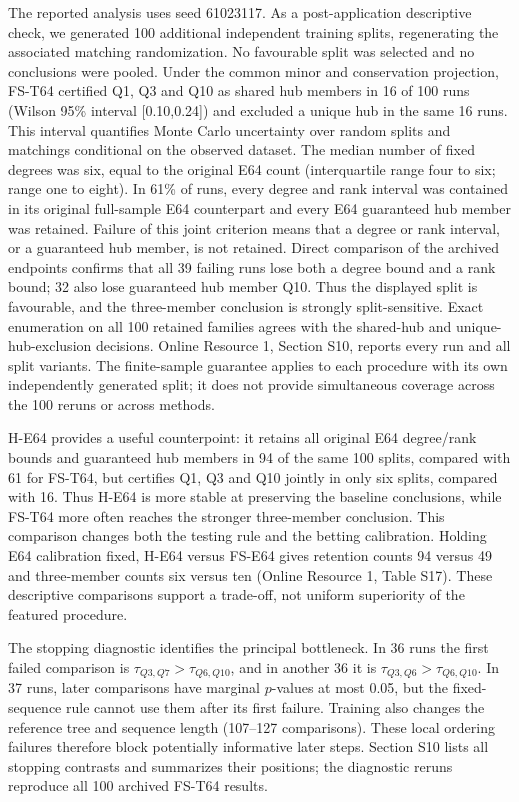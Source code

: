\documentclass[11pt]{article}
\theoremstyle{plain}
\theoremstyle{definition}\newtheorem{remark}{Remark}\newtheorem{example}{Example}
\begin{document}
The reported analysis uses seed 61023117. As a post-application descriptive check, we generated 100 additional independent training splits, regenerating the associated matching randomization. No favourable split was selected and no conclusions were pooled. Under the common minor and conservation projection, FS-T64 certified Q1, Q3 and Q10 as shared hub members in 16 of 100 runs (Wilson 95\% interval [0.10,0.24]) and excluded a unique hub in the same 16 runs. This interval quantifies Monte Carlo uncertainty over random splits and matchings conditional on the observed dataset. The median number of fixed degrees was six, equal to the original E64 count (interquartile range four to six; range one to eight). In 61\% of runs, every degree and rank interval was contained in its original full-sample E64 counterpart and every E64 guaranteed hub member was retained. Failure of this joint criterion means that a degree or rank interval, or a guaranteed hub member, is not retained. Direct comparison of the archived endpoints confirms that all 39 failing runs lose both a degree bound and a rank bound; 32 also lose guaranteed hub member Q10. Thus the displayed split is favourable, and the three-member conclusion is strongly split-sensitive. Exact enumeration on all 100 retained families agrees with the shared-hub and unique-hub-exclusion decisions. Online Resource 1, Section S10, reports every run and all split variants. The finite-sample guarantee applies to each procedure with its own independently generated split; it does not provide simultaneous coverage across the 100 reruns or across methods.

H-E64 provides a useful counterpoint: it retains all original E64 degree/rank bounds and guaranteed hub members in 94 of the same 100 splits, compared with 61 for FS-T64, but certifies Q1, Q3 and Q10 jointly in only six splits, compared with 16. Thus H-E64 is more stable at preserving the baseline conclusions, while FS-T64 more often reaches the stronger three-member conclusion. This comparison changes both the testing rule and the betting calibration. Holding E64 calibration fixed, H-E64 versus FS-E64 gives retention counts 94 versus 49 and three-member counts six versus ten (Online Resource 1, Table S17). These descriptive comparisons support a trade-off, not uniform superiority of the featured procedure.

The stopping diagnostic identifies the principal bottleneck. In 36 runs the first failed comparison is $\tau_{Q3,Q7}>\tau_{Q6,Q10}$, and in another 36 it is $\tau_{Q3,Q6}>\tau_{Q6,Q10}$. In 37 runs, later comparisons have marginal $p$-values at most 0.05, but the fixed-sequence rule cannot use them after its first failure. Training also changes the reference tree and sequence length (107--127 comparisons). These local ordering failures therefore block potentially informative later steps. Section S10 lists all stopping contrasts and summarizes their positions; the diagnostic reruns reproduce all 100 archived FS-T64 results.
\end{document}
